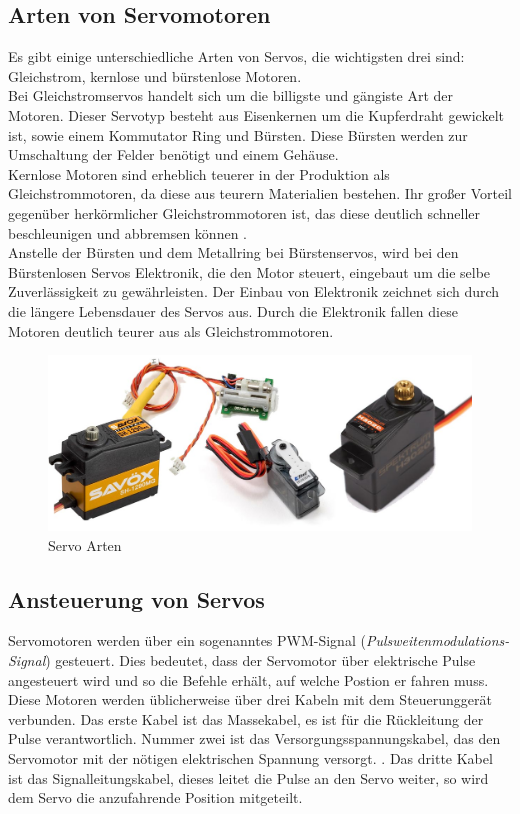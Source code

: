 \subsection{Arten von Servomotoren}
Es gibt einige unterschiedliche Arten von Servos, die wichtigsten drei sind: Gleichstrom, kernlose und bürstenlose Motoren. \\
Bei Gleichstromservos handelt sich um die billigste und gängiste Art der Motoren. Dieser Servotyp besteht aus Eisenkernen um die Kupferdraht gewickelt ist, sowie einem Kommutator Ring und Bürsten. Diese Bürsten werden zur Umschaltung der Felder benötigt und einem Gehäuse. \\
Kernlose Motoren sind erheblich teuerer in der Produktion als Gleichstrommotoren, da diese aus teurern Materialien bestehen. Ihr großer Vorteil gegenüber herkörmlicher Gleichstrommotoren ist, das diese deutlich schneller beschleunigen und abbremsen können \parencite{ServomotorArten}. \\
Anstelle der Bürsten und dem Metallring bei Bürstenservos, wird bei den Bürstenlosen Servos Elektronik, die den Motor steuert, eingebaut um die selbe Zuverlässigkeit zu gewährleisten. Der Einbau von Elektronik zeichnet sich durch die längere Lebensdauer des Servos aus. Durch die Elektronik fallen diese Motoren deutlich teurer aus als Gleichstrommotoren. \\

\begin{figure}[H]
	\centering
	\includegraphics[width=0.5\linewidth]{images/ServoArten.jpg}
	\caption[Servo Arten]{Servo Arten}
	\label{fig:Servo Arten}
\end{figure}


\newpage
\subsection{Ansteuerung von Servos}
Servomotoren werden über ein sogenanntes PWM-Signal (\textit{Pulsweitenmodulations-Signal}) gesteuert. Dies bedeutet, dass der Servomotor über elektrische Pulse angesteuert wird und so die Befehle erhält, auf welche Postion er fahren muss. Diese Motoren werden üblicherweise über drei Kabeln mit dem Steuerunggerät verbunden. Das erste Kabel ist das Massekabel, es ist für die Rückleitung der Pulse verantwortlich. Nummer zwei ist das Versorgungsspannungskabel, das den Servomotor mit der nötigen elektrischen Spannung versorgt. \parencite{ServomotorAnsteuerung}. Das dritte Kabel ist das Signalleitungskabel, dieses  leitet die Pulse an den Servo weiter, so wird dem Servo die anzufahrende Position mitgeteilt.\\


